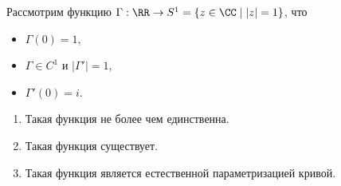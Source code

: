 \documentclass[12pt,a4paper]{article}
\begin{document}
    \begin{theorem}
        Рассмотрим функцию $\Gamma: \RR \to S^1 = \{z \in \CC \mid |z| = 1\}$, что
        \begin{itemize}
            \item $\Gamma(0) = 1$,
            \item $\Gamma \in C^1$ и $|\Gamma'| = 1$,
            \item $\Gamma'(0) = i$.
        \end{itemize}
        \begin{enumerate}
            \item Такая функция не более чем единственна.
            \item Такая функция существует.
            \item Такая функция является естественной параметризацией кривой.
        \end{enumerate}
    \end{theorem}
\end{document}
